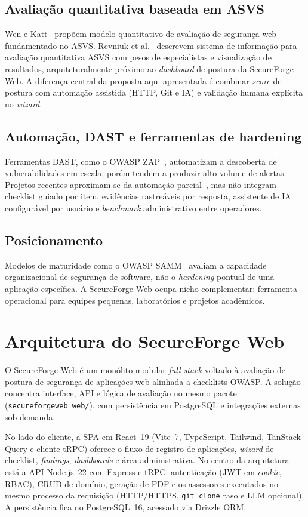 \documentclass[12pt]{article}
\begin{document}
\subsection{Avaliação quantitativa baseada em ASVS}
Wen e Katt~\cite{wen-katt-2021} propõem modelo quantitativo de avaliação de segurança web fundamentado no ASVS. Revniuk et al.~\cite{revniuk-2023} descrevem sistema de informação para avaliação quantitativa ASVS com pesos de especialistas e visualização de resultados, arquiteturalmente próximo ao \emph{dashboard} de postura da SecureForge Web. A diferença central da proposta aqui apresentada é combinar \emph{score} de postura com automação assistida (HTTP, Git e IA) e validação humana explícita no \emph{wizard}.

\subsection{Automação, DAST e ferramentas de hardening}
Ferramentas DAST, como o OWASP ZAP~\cite{owasp-zap}, automatizam a descoberta de vulnerabilidades em escala, porém tendem a produzir alto volume de alertas. Projetos recentes aproximam-se da automação parcial~\cite{lee-2024,rodriguez-2025}, mas não integram checklist guiado por item, evidências rastreáveis por resposta, assistente de IA configurável por usuário e \emph{benchmark} administrativo entre operadores.

\subsection{Posicionamento}
Modelos de maturidade como o OWASP SAMM~\cite{owasp-samm} avaliam a capacidade organizacional de segurança de software, não o \emph{hardening} pontual de uma aplicação específica. A SecureForge Web ocupa nicho complementar: ferramenta operacional para equipes pequenas, laboratórios e projetos acadêmicos.

\section{Arquitetura do SecureForge Web}
O SecureForge Web é um monólito modular \emph{full-stack} voltado à avaliação de postura de segurança de aplicações web alinhada a checklists OWASP. A solução concentra interface, API e lógica de avaliação no mesmo pacote (\texttt{secureforgeweb\_web/}), com persistência em PostgreSQL e integrações externas sob demanda.

No lado do cliente, a SPA em React~19 (Vite~7, TypeScript, Tailwind, TanStack Query e cliente tRPC) oferece o fluxo de registro de aplicações, \emph{wizard} de checklist, \emph{findings}, \emph{dashboards} e área administrativa. No centro da arquitetura está a API Node.js~22 com Express e tRPC: autenticação (JWT em \emph{cookie}, RBAC), CRUD de domínio, geração de PDF e os assessores executados no mesmo processo da requisição (HTTP/HTTPS, \texttt{git clone} raso e LLM opcional). A persistência fica no PostgreSQL~16, acessado via Drizzle ORM.
\end{document}
